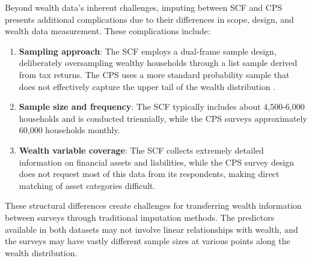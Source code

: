 Beyond wealth data's inherent challenges, imputing between SCF and CPS presents additional complications due to their differences in scope, design, and wealth data measurement. These complications include:

\begin{enumerate}
    \item \textbf{Sampling approach}: The SCF employs a dual-frame sample design, deliberately oversampling wealthy households through a list sample derived from tax returns. The CPS uses a more standard probability sample that does not effectively capture the upper tail of the wealth distribution \citep{bryant2023general}.
    \item \textbf{Sample size and frequency}: The SCF typically includes about 4,500-6,000 households and is conducted triennially, while the CPS surveys approximately 60,000 households monthly.
    \item \textbf{Wealth variable coverage}: The SCF collects extremely detailed information on financial assets and liabilities, while the CPS survey design does not request most of this data from its respondents, making direct matching of asset categories difficult.
\end{enumerate}

These structural differences create challenges for transferring wealth information between surveys through traditional imputation methods. The predictors available in both datasets may not involve linear relationships with wealth, and the surveys may have vastly different sample sizes at various points along the wealth distribution.